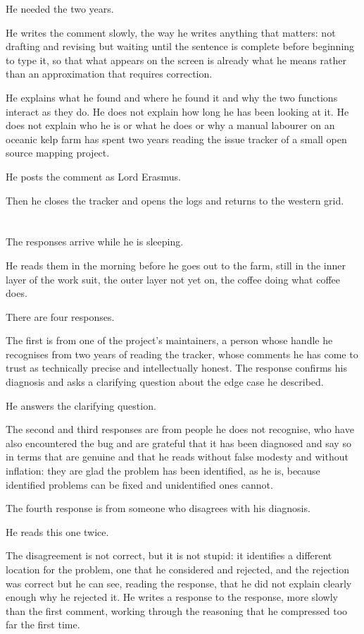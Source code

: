 He needed the two years.

He writes the comment slowly, the way he writes
anything that matters: not drafting and revising
but waiting until the sentence is complete before
beginning to type it, so that what appears on
the screen is already what he means rather than
an approximation that requires correction.

He explains what he found and where he found it
and why the two functions interact as they do.
He does not explain how long he has been looking
at it. He does not explain who he is or what he
does or why a manual labourer on an oceanic kelp
farm has spent two years reading the issue tracker
of a small open source mapping project.

He posts the comment as Lord Erasmus.

Then he closes the tracker and opens the logs
and returns to the western grid.

\section{}

The responses arrive while he is sleeping.

He reads them in the morning before he goes out
to the farm, still in the inner layer of the work
suit, the outer layer not yet on, the coffee doing
what coffee does.

There are four responses.

The first is from one of the project's maintainers,
a person whose handle he recognises from two years
of reading the tracker, whose comments he has come
to trust as technically precise and intellectually
honest. The response confirms his diagnosis and
asks a clarifying question about the edge case he
described.

He answers the clarifying question.

The second and third responses are from people he
does not recognise, who have also encountered the
bug and are grateful that it has been diagnosed and
say so in terms that are genuine and that he reads
without false modesty and without inflation: they
are glad the problem has been identified, as he is,
because identified problems can be fixed and
unidentified ones cannot.

The fourth response is from someone who disagrees
with his diagnosis.

He reads this one twice.

The disagreement is not correct, but it is not
stupid: it identifies a different location for
the problem, one that he considered and rejected,
and the rejection was correct but he can see,
reading the response, that he did not explain
clearly enough why he rejected it. He writes
a response to the response, more slowly than
the first comment, working through the reasoning
that he compressed too far the first time.


